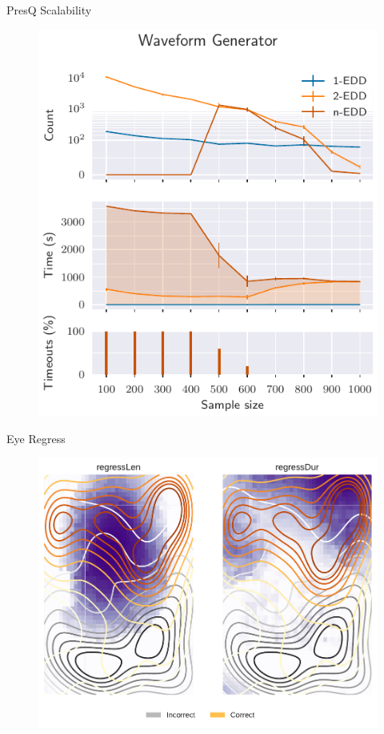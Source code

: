 \documentclass[10pt,compress]{beamer}
\begin{document}
\begin{frame}{PresQ Scalability}
\begin{figure}
    \centering
    \includegraphics[height=\textheight]{scalability_sample_wave.pdf}
\end{figure}
\end{frame}

\begin{frame}{Eye Regress}
\begin{figure}
    \centering
    \includegraphics[height=\textheight]{eye_regress-eps-converted-to.pdf}
\end{figure}
\end{frame}
\end{document}
